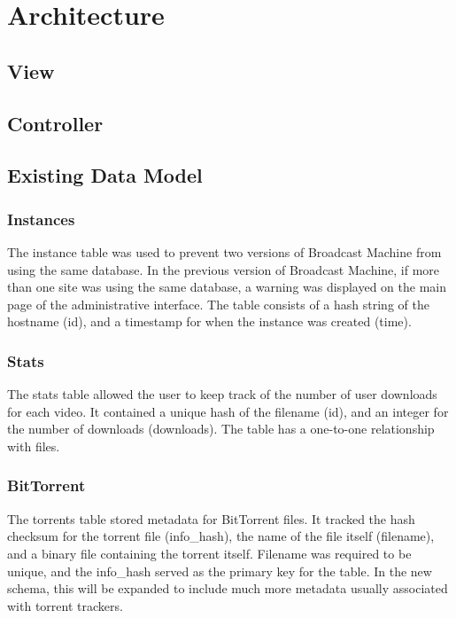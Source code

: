 \documentclass[a4paper,12pt]{report}
\begin{document}
\chapter{Architecture}

\section{View}

\section{Controller}

\section{Existing Data Model}


\subsection{Instances}
The instance table was used to prevent two versions of Broadcast Machine from using the same database. In the previous version of Broadcast Machine, if more than one site was using the same database, a warning was displayed on the main page of the administrative interface. The table consists of a hash string of the hostname (id), and a timestamp for when the instance was created (time). 


\subsection{Stats}
The stats table allowed the user to keep track of the number of user downloads for each video. It contained a unique hash of the filename (id), and an integer for the number of downloads (downloads). The table has a one-to-one relationship with files.


\subsection{BitTorrent}
The torrents table stored metadata for BitTorrent files. It tracked the hash checksum for the torrent file (info\_hash), the name of the file itself (filename), and a binary file containing the torrent itself. Filename was required to be unique, and the info\_hash served as the primary key for the table. In the new schema, this will be expanded to include much more metadata usually associated with torrent trackers.
\end{document}
